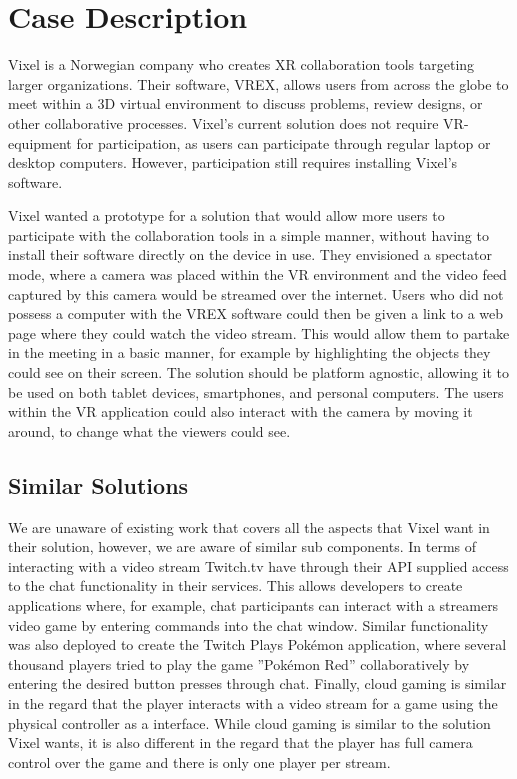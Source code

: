 \section{Case Description}

Vixel\cite{vixel} is a Norwegian company who creates XR collaboration tools targeting larger organizations. Their software, VREX\cite{vrex}, allows users from across the globe to meet within a 3D virtual environment to discuss problems, review designs, or other collaborative processes. Vixel's current solution does not require VR-equipment for participation, as users can participate through regular laptop or desktop computers. However, participation still requires installing Vixel's software. 

Vixel wanted a prototype for a solution that would allow more users to participate with the collaboration tools in a simple manner, without having to install their software directly on the device in use. They envisioned a spectator mode, where a camera was placed within the VR environment and the video feed captured by this camera would be streamed over the internet. Users who did not possess a computer with the VREX software could then be given a link to a web page where they could watch the video stream. This would allow them to partake in the meeting in a basic manner, for example by highlighting the objects they could see on their screen. The solution should be platform agnostic, allowing it to be used on both tablet devices, smartphones, and personal computers. The users within the VR application could also interact with the camera by moving it around, to change what the viewers could see.

\subsection{Similar Solutions}
We are unaware of existing work that covers all the aspects that Vixel want in their solution, however, we are aware of similar sub components. In terms of interacting with a video stream Twitch.tv have through their API supplied access to the chat functionality in their services. This allows developers to create applications where, for example, chat participants can interact with a streamers video game by entering commands into the chat window\cite{twitch_integration_clustertruck, twitch_integration_details}. Similar functionality was also deployed to create the Twitch Plays Pokémon application, where several thousand players tried to play the game ''Pokémon Red'' collaboratively by entering the desired button presses through chat\cite{twitch_plays_pokemon}. Finally, cloud gaming is similar in the regard that the player interacts with a video stream for a game using the physical controller as a interface. While cloud gaming is similar to the solution Vixel wants, it is also different in the regard that the player has full camera control over the game and there is only one player per stream.  


